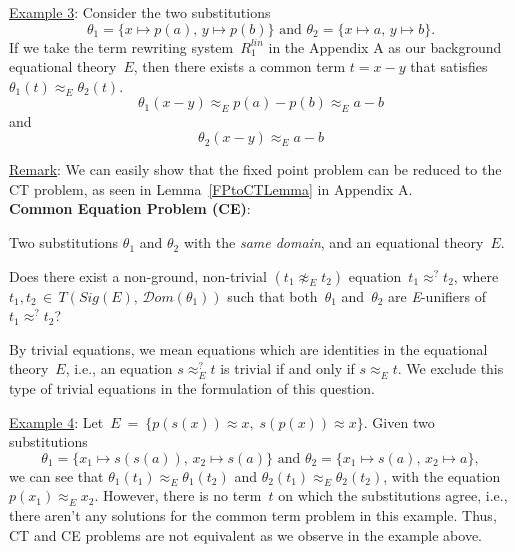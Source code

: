 \documentclass{lmcs} %
\theoremstyle{plain}\newtheorem{satz}[thm]{Satz} %
\newcommand{\dom}{\mathcal{D}om}
\begin{document}
\vspace{0.05in}
\noindent
\underline{Example 3}: Consider the two substitutions 
\[
\theta_{1} = \{ x
\mapsto p(a), \, y \mapsto p(b) \} \textrm{ and } \theta_{2} = \{ x \mapsto a,
\, y \mapsto b \}.
\]
If we take the term rewriting system~$R_1^{lin}$ in the Appendix A
as our background equational theory~$E$, then there exists a common term $t =
x-y$ that satisfies $\theta_{1}(t) \approx_E^{}
\theta_{2}(t)$. \[ \theta_1 ( x-y ) \approx_E^{} p(a)- p(b) \approx_E^{}
a-b \] and \[\theta_2 ( x-y ) \approx_E^{} a-b \]
\vspace{0.05in}

\noindent
\underline{Remark}: We can easily show that the fixed point problem can be reduced to the CT problem, as seen in Lemma~\ref{FPtoCTLemma} in Appendix A.\\[-5pt]

\noindent
{\large\bf Common Equation Problem (CE)}:

\begin{description}[align=left]
\item[Input] Two substitutions $\theta_1^{}$ and $\theta_2^{}$ with the 
 \emph{same domain}, and an
  equational theory~$E$.
\item[Question] Does there exist a non-ground, non-trivial $(t_1
  \not\approx_E^{} t_2)$ equation~$t_1^{} \approx_{}^? t_2^{}$, where
  $t_1^{}, t_2^{} \, \in \, T(Sig(E), \, \dom(\theta_1^{}))$ such that
  both~$\theta_1^{}$ and~$\theta_2^{}$ are \emph{E}-unifiers
  of~$t_1^{} \approx_{}^? t_2^{}$?\\
\end{description} %
By trivial equations, we mean equations which are identities
in the equational theory~$E$, i.e., an equation $s \approx_{E}^? t$ is
trivial if and only if $s \approx_{E}^{} t$.
We exclude this type of trivial equations in the formulation of
this question.



\vspace{0.05in}
\noindent
\underline{Example 4}: Let $\, E ~ = ~ \{ p(s(x)) \approx x, \; s(p(x)) \approx x \}$.
Given two substitutions \[\theta_{1} = \{ x_1
\mapsto s(s(a)), \, x_2 \mapsto s(a) \}\textrm{ and }\theta_{2} = \{ x_1
\mapsto s(a), \, x_2 \mapsto a \},\] we can see that $\theta_{1}(t_1)
\approx_E^{} \theta_{1}(t_2)$ and $\theta_{2}(t_1) \approx_E^{}
\theta_{2}(t_2)$, with the equation $p(x_1) \approx_E^{} x_2$. However,
there is no term~$t$ on which the substitutions agree, i.e., there
aren't any solutions for the common term problem in this example.
Thus, CT and CE problems are not equivalent as we observe in the example above.
\end{document}
